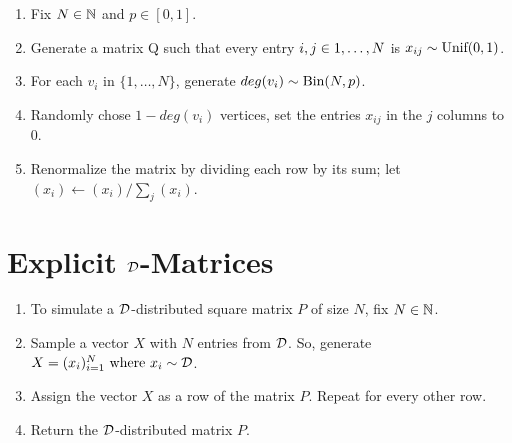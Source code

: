 \newpage

\begin{algorithm} \hfill
\begin{enumerate}
	\item{Fix $N \in \N$ and $p \in [0,1]$}.
	\item{Generate a matrix Q such that every entry $i,j\in \oneto[N]$ is $x_{ij} \sim \Unif(0,1)$.}
	\item{For each $v_i$ in $\{1,\dots,N\}$, generate $deg(v_i) \sim \Bin(N,p)$.}
	\item{Randomly chose $1-deg(v_i)$ vertices, set the entries $x_{ij}$ in the $j$ columns to 0.}
	\item{Renormalize the matrix by dividing each row by its sum; let $(x_i) \leftarrow (x_i)/\sum_j(x_i)$}.
\end{enumerate}
\end{algorithm}


\section{Explicit $\D$-Matrices}

\begin{algorithm} \hfill
\begin{enumerate}
	\item To simulate a $\D$-distributed square matrix $P$ of size $N$, fix $N \in \N$.
	\item Sample a vector $X$ with $N$ entries from $\D$. So, generate $X = (x_i)_{i = 1}^N \where x_i \sim \D$.
	\item Assign the vector $X$ as a row of the matrix $P$. Repeat for every other row.
	\item Return the $\D$-distributed matrix $P$.
\end{enumerate}
\end{algorithm}

\dimitriuALGORITHM

